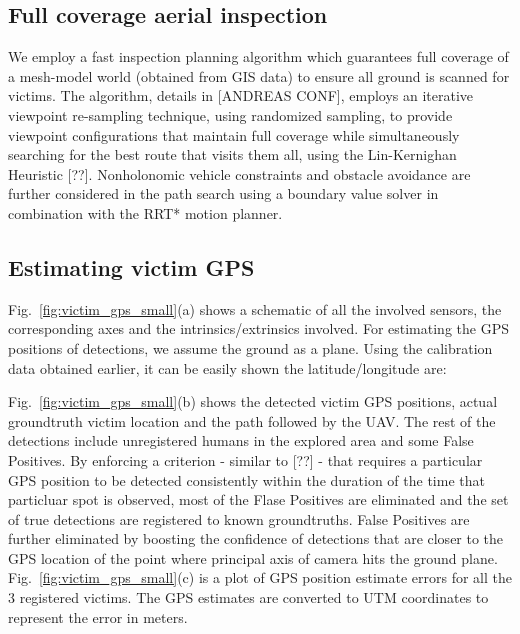 \documentclass[runningheads]{llncs}
\begin{document}
\subsection{Full coverage aerial inspection}

We employ a fast inspection planning algorithm which guarantees full coverage of a mesh-model world (obtained from GIS data) to ensure all ground is scanned for victims. The algorithm, details in [ANDREAS CONF], employs an iterative viewpoint re-sampling technique, using randomized sampling, to provide viewpoint configurations that maintain full coverage while simultaneously searching for the best route that visits them all, using the Lin-Kernighan Heuristic [??]. Nonholonomic vehicle constraints and obstacle avoidance are further considered in the path search using a boundary value solver in combination with the RRT* motion planner.

\subsection{Estimating victim GPS}

Fig.~\ref{fig:victim_gps_small}(a) shows a schematic of all the involved sensors, the corresponding axes and the intrinsics/extrinsics involved. For estimating the GPS positions of detections, we assume the ground as a plane. Using the calibration data obtained earlier, it can be easily shown the latitude/longitude are:

Fig.~\ref{fig:victim_gps_small}(b) shows the detected victim GPS positions, actual groundtruth victim location and the path followed by the UAV. The rest of the detections include unregistered humans in the explored area and some False Positives. By enforcing a criterion - similar to [??] - that requires a particular GPS position to be detected consistently within the duration of the time that particluar spot is observed, most of the Flase Positives are eliminated and the set of true detections are registered to known groundtruths. False Positives are further eliminated by boosting the confidence of detections that are closer to the GPS location of the point where principal axis of camera hits the ground plane. Fig.~\ref{fig:victim_gps_small}(c) is a plot of GPS position estimate errors for all the 3 registered victims. The GPS estimates are converted to UTM coordinates to represent the error in meters.
\end{document}
